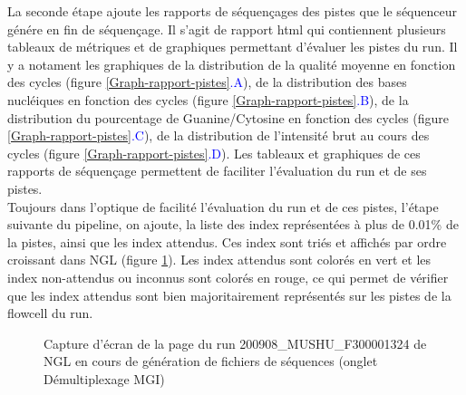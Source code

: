 La seconde étape ajoute les rapports de séquençages des pistes que le séquenceur génére en fin de séquençage.
Il s'agit de rapport html qui contiennent plusieurs tableaux de métriques et de graphiques permettant d'évaluer les pistes du run.
Il y a notament les graphiques de la distribution de la qualité moyenne en fonction des cycles (figure \ref{Graph-rapport-pistes}\textcolor{blue}{.A}), de la distribution des bases nucléiques en fonction des cycles (figure \ref{Graph-rapport-pistes}\textcolor{blue}{.B}), de la distribution du pourcentage de Guanine/Cytosine en fonction des cycles (figure \ref{Graph-rapport-pistes}\textcolor{blue}{.C}), de la distribution de l'intensité brut au cours des cycles (figure \ref{Graph-rapport-pistes}\textcolor{blue}{.D}).
Les tableaux et graphiques de ces rapports de séquençage permettent de faciliter l'évaluation du run et de ses pistes.\\

Toujours dans l'optique de facilité l'évaluation du run et de ces pistes, l'étape suivante du pipeline, on ajoute, la liste des index représentées à plus de 0.01\% de la pistes, ainsi que les index attendus.
Ces index sont triés et affichés par ordre croissant dans NGL (figure \ref{top-index}).
Les index attendus sont colorés en vert et les index non-attendus ou inconnus sont colorés en rouge, ce qui permet de vérifier que les index attendus sont bien majoritairement représentés sur les pistes de la flowcell du run.

\begin{figure}[H]
    \centering
    \caption{\footnotesize{Capture d'écran de la page du run 200908\_MUSHU\_F300001324 de NGL en cours de génération de fichiers de séquences (onglet \og Démultiplexage MGI\fg{})}}
    \label{top-index}
\end{figure}

